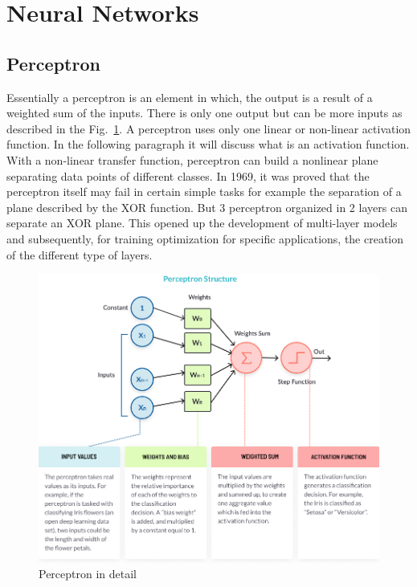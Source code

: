\documentclass[12pt]{report}
\begin{document}
\section{Neural Networks}

\subsection{Perceptron}

Essentially a perceptron is an element in which, the output is a result of a weighted sum
of the inputs. There is only one output but can be more inputs as described in the Fig.~\ref{fig:perceptron}. 
A perceptron uses only one linear or non-linear activation function. In the following paragraph it will discuss what is an activation function.
With a non-linear transfer function, perceptron can build a nonlinear plane separating data points of different classes.
In 1969, it was proved that the perceptron itself may fail in certain simple tasks for example
the separation of a plane described by the XOR function. 
But 3 perceptron organized in 2 layers can separate an XOR plane.
This opened up the development of multi-layer models and subsequently, for training optimization for specific
applications, the creation of the different type of layers.

\begin{figure}[t]
    \centering
    \includegraphics[width=\textwidth]{perceptron-structure.png}
    \caption{Perceptron in detail \cite{percepimage}}
    \label{fig:perceptron}
\end{figure}
\end{document}
